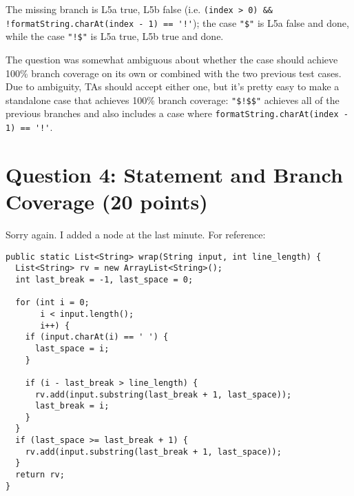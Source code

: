 \documentclass[12pt]{article}
\begin{document}
The missing branch is L5a true, L5b false (i.e. 
\verb+(index > 0) && !formatString.charAt(index - 1) == '!'+);
the case \verb+"$"+ is L5a false and done, while the case \verb+"!$"+ is
L5a true, L5b true and done.

The question was somewhat ambiguous about whether the case should achieve 100\%
branch coverage on its own or combined with the two previous test cases.
Due to ambiguity, TAs should accept either one, but it's pretty easy to
make a standalone case that achieves 100\% branch coverage: \verb+"$!$$"+
achieves all of the previous branches and also includes a case where
\verb+formatString.charAt(index - 1) == '!'+.

\newpage
\section*{Question 4: Statement and Branch Coverage (20 points)}
Sorry again. I added a node at the last minute. For reference:
\begin{lstlisting}
public static List<String> wrap(String input, int line_length) {
  List<String> rv = new ArrayList<String>();
  int last_break = -1, last_space = 0;
  
  for (int i = 0;
       i < input.length();
       i++) {
    if (input.charAt(i) == ' ') {
      last_space = i;
    }
    
    if (i - last_break > line_length) {
      rv.add(input.substring(last_break + 1, last_space));
      last_break = i;
    }
  }
  if (last_space >= last_break + 1) {
    rv.add(input.substring(last_break + 1, last_space));
  }
  return rv;
}
\end{lstlisting}

\begin{center}
\end{center}
\end{document}
